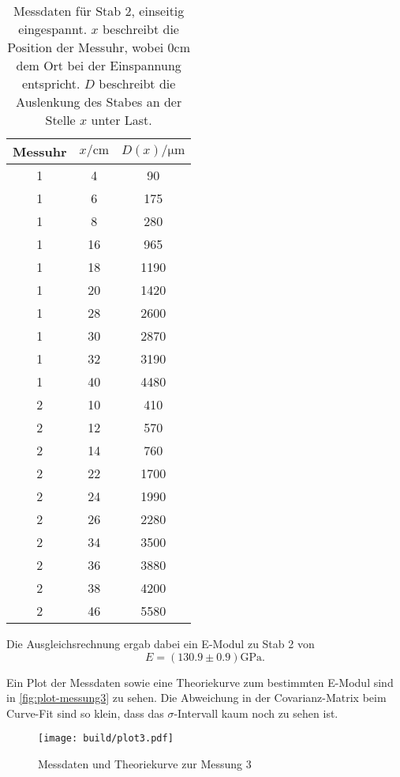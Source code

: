 \begin{table}
	\centering
	\caption{Messdaten für Stab 2, einseitig eingespannt. $x$ beschreibt
	die Position der Messuhr, wobei $0\si{\centi\meter}$
	dem Ort bei der Einspannung entspricht.
	$D$ beschreibt die Auslenkung des Stabes an der Stelle $x$ unter Last.}
	\label{tab:messdaten3}
	\begin{tabular}{c c c}
	\toprule
	Messuhr &
	$x / \si{\centi\meter}$ &
	$D(x) / \si{\micro\meter}$
	\\
	\midrule
	1 & 4 & 90 \\
	1 & 6 & 175 \\
	1 & 8 & 280 \\
	1 & 16 & 965 \\
	1 & 18 & 1190 \\
	1 & 20 & 1420 \\
	1 & 28 & 2600 \\
	1 & 30 & 2870 \\
	1 & 32 & 3190 \\
	1 & 40 & 4480 \\
	2 & 10 & 410 \\
	2 & 12 & 570 \\
	2 & 14 & 760 \\
	2 & 22 & 1700 \\
	2 & 24 & 1990 \\
	2 & 26 & 2280 \\
	2 & 34 & 3500 \\
	2 & 36 & 3880 \\
	2 & 38 & 4200 \\
	2 & 46 & 5580 \\
	\bottomrule
\end{tabular}
\end{table}

Die Ausgleichsrechnung ergab dabei ein E-Modul zu Stab 2 von
\begin{equation}
	E = (130.9 \pm 0.9) \si{\giga\pascal}.
	\label{eqn:E-messung3}
\end{equation}

Ein Plot der Messdaten sowie eine Theoriekurve zum bestimmten E-Modul sind in 
\autoref{fig:plot-messung3} zu sehen. Die Abweichung in der Covarianz-Matrix beim
Curve-Fit sind so klein, dass das $\sigma$-Intervall kaum noch zu sehen ist.

\begin{figure}[H]
	\centering
	\texttt{[image: build/plot3.pdf]}
	\caption{Messdaten und Theoriekurve zur Messung 3}
	\label{fig:plot-messung3}
\end{figure}


